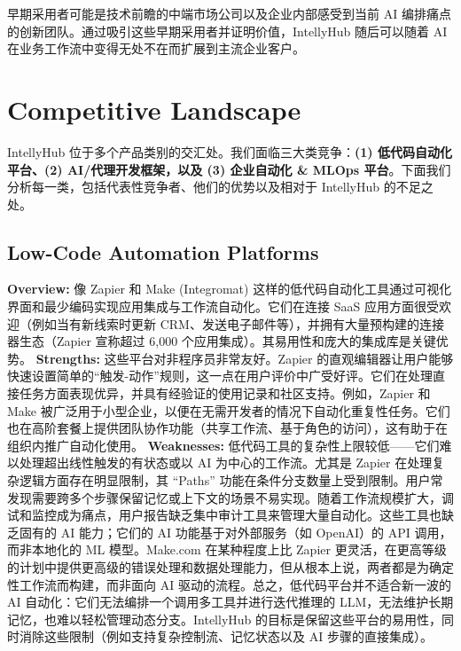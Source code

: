 \documentclass[11pt, a4paper, oneside]{article}
\begin{document}
早期采用者可能是技术前瞻的中端市场公司以及企业内部感受到当前 AI 编排痛点的创新团队。通过吸引这些早期采用者并证明价值，IntellyHub 随后可以随着 AI 在业务工作流中变得无处不在而扩展到主流企业客户。

\section{Competitive Landscape}
IntellyHub 位于多个产品类别的交汇处。我们面临三大类竞争：\textbf{(1) 低代码自动化平台、(2) AI/代理开发框架，以及 (3) 企业自动化 \& MLOps 平台}。下面我们分析每一类，包括代表性竞争者、他们的优势以及相对于 IntellyHub 的不足之处。

\subsection{Low-Code Automation Platforms}

\textbf{Overview:} 像 Zapier 和 Make (Integromat) 这样的低代码自动化工具通过可视化界面和最少编码实现应用集成与工作流自动化。它们在连接 SaaS 应用方面很受欢迎（例如当有新线索时更新 CRM、发送电子邮件等），并拥有大量预构建的连接器生态（Zapier 宣称超过 6,000 个应用集成\cite{zapierApps}）。其易用性和庞大的集成库是关键优势。
\newline\newline
\textbf{Strengths:} 这些平台对非程序员非常友好。Zapier 的直观编辑器让用户能够快速设置简单的“触发-动作”规则，这一点在用户评价中广受好评\cite{g2ZapierReviews}。它们在处理直接任务方面表现优异，并具有经验证的使用记录和社区支持。例如，Zapier 和 Make 被广泛用于小型企业，以便在无需开发者的情况下自动化重复性任务。它们也在高阶套餐上提供团队协作功能（共享工作流、基于角色的访问），这有助于在组织内推广自动化使用\cite{zapierPricing}。
\newline\newline
\textbf{Weaknesses:} 低代码工具的复杂性上限较低——它们难以处理超出线性触发的有状态或以 AI 为中心的工作流。尤其是 Zapier 在处理复杂逻辑方面存在明显限制，其 “Paths” 功能在条件分支数量上受到限制。用户常发现需要跨多个步骤保留记忆或上下文的场景不易实现。随着工作流规模扩大，调试和监控成为痛点，用户报告缺乏集中审计工具来管理大量自动化\cite{g2ZapierReviews}。这些工具也缺乏固有的 AI 能力；它们的 AI 功能基于对外部服务（如 OpenAI）的 API 调用，而非本地化的 ML 模型\cite{zapierOpenAI}。Make.com 在某种程度上比 Zapier 更灵活，在更高等级的计划中提供更高级的错误处理和数据处理能力\cite{g2MakeVsZapier}，但从根本上说，两者都是为确定性工作流而构建，而非面向 AI 驱动的流程。总之，低代码平台并不适合新一波的 AI 自动化：它们无法编排一个调用多工具并进行迭代推理的 LLM，无法维护长期记忆，也难以轻松管理动态分支。IntellyHub 的目标是保留这些平台的易用性，同时消除这些限制（例如支持复杂控制流、记忆状态以及 AI 步骤的直接集成）。
\end{document}
